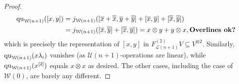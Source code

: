 \documentclass[11pt]{amsart}
\theoremstyle{plain}
\theoremstyle{definition}
\newcommand{\calW}{\mathcal{W}}
\newcommand{\calU}{\mathcal{U}}
\newcommand{\calL}{\mathcal{L}}
\theoremstyle{plain}
\newcommand{\restn}[1]{#1^{[2]}}
\newcommand{\quadratic}{\textup{qu}}
\begin{document}
\begin{Lie algebras in characteristic 2 and their homotopy operations}
\begin{proof}
\begin{alignat*}{2}
\quadratic_{\calW(n+1)}([x,y])&=j_{\calW(n+1)}([\overline{x}+\overline{\overline{x}},\overline{y}+\overline{\overline{y}}]+[\overline{x},\overline{y}]+[\overline{\overline{x}},\overline{\overline{y}}])\\
&=j_{\calW(n+1)}([\overline{x},\overline{\overline{y}}]+[\overline{\overline{x}},\overline{y}])=x\otimes y+y\otimes x,\textbf{Overlines ok?}
\end{alignat*}
which is precisely the representation of $[x,y]$ in $F^{(2)}_{\calL(n+1)}V\subseteq V^{\otimes2}$. Similarly, $\quadratic_{\calW(n+1)}(x\lambda_i)$ vanishes (as $\calU(n+1)$-operations are linear), while $\quadratic_{\calW(n+1)}(\restn{x})$ equals $x\otimes x$ as desired. The other cases, including the case of $\calW(0)$, are barely any different.
\end{proof}








\end{Lie algebras in characteristic 2 and their homotopy operations}
\end{document}

